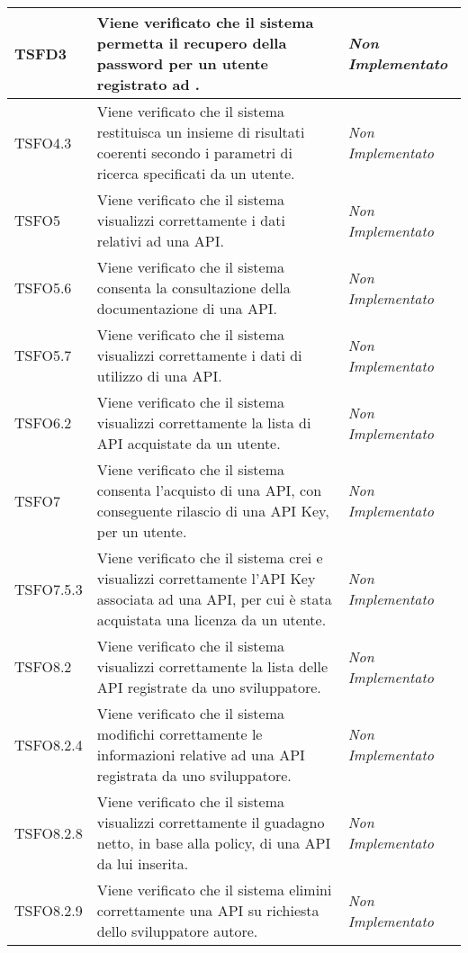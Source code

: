 \begin{longtable}{|>{\centering\arraybackslash}p{2.3cm}|>{\centering\arraybackslash}p{7.5cm} | >{\centering\arraybackslash}p{3.8cm}|}
		\hypertarget{TSFD3}{TSFD3} & Viene verificato che il sistema permetta il recupero della password per un utente registrato ad \progetto. & \textit{Non Implementato}\\ \hline
		\hypertarget{TSFO4.3}{TSFO4.3} & Viene verificato che il sistema restituisca un insieme di risultati coerenti secondo i parametri di ricerca specificati da un utente. & \textit{Non Implementato}\\ \hline	
		\hypertarget{TSFO5}{TSFO5} & Viene verificato che il sistema visualizzi correttamente i dati relativi ad una API. & \textit{Non Implementato}\\ \hline
		\hypertarget{TSFO5.6}{TSFO5.6} & Viene verificato che il sistema consenta la consultazione della documentazione di una API. & \textit{Non Implementato}\\ \hline
		\hypertarget{TSFO5.7}{TSFO5.7} & Viene verificato che il sistema visualizzi correttamente i dati di utilizzo di una API. & \textit{Non Implementato}\\ \hline
		\hypertarget{TSFO6.2}{TSFO6.2} & Viene verificato che il sistema visualizzi correttamente la lista di API acquistate da un utente. & \textit{Non Implementato}\\ \hline
		\hypertarget{TSFO7}{TSFO7} & Viene verificato che il sistema consenta l'acquisto di una API, con conseguente rilascio di una API Key, per un utente. & \textit{Non Implementato}\\ \hline
		\hypertarget{TSFO7.5.3}{TSFO7.5.3} & Viene verificato che il sistema crei e visualizzi correttamente l'API Key associata ad una API, per cui è stata acquistata una licenza da un utente. & \textit{Non Implementato}\\ \hline
		\hypertarget{TSFO8.2}{TSFO8.2} & Viene verificato che il sistema visualizzi correttamente la lista delle API registrate da uno sviluppatore. & \textit{Non Implementato}\\ \hline
		\hypertarget{TSFO8.2.4}{TSFO8.2.4} & Viene verificato che il sistema modifichi correttamente le informazioni relative ad una API registrata da uno sviluppatore. & \textit{Non Implementato}\\ \hline
		\hypertarget{TSFO8.2.8}{TSFO8.2.8} & Viene verificato che il sistema visualizzi correttamente il guadagno netto, in base alla policy, di una API da lui inserita. & \textit{Non Implementato}\\ \hline
		\hypertarget{TSFO8.2.9}{TSFO8.2.9} & Viene verificato che il sistema elimini correttamente una API su richiesta dello sviluppatore autore. & \textit{Non Implementato}\\ \hline

\end{longtable}
